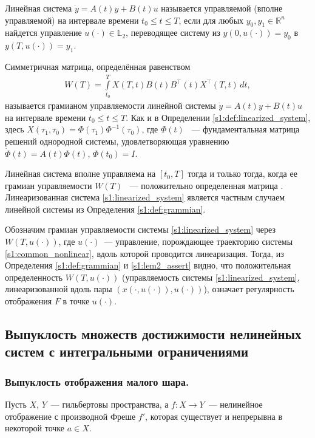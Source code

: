 \documentclass[../main.tex]{subfiles}
\begin{document}
\begin{definition}
	Линейная система $\dot{y} = A(t) y + B(t) u $ называется управляемой (вполне управляемой) на интервале времени $ t_0 \leqslant t \leqslant T $, если для любых $y_0, y_1 \in \mathbb{R}^n$ найдется управление $u(\cdot) \in \mathbb{L}_2$, переводящее систему из $y(0, u(\cdot)) = y_0 $ в $y(T, u(\cdot)) = y_1 $.
\end{definition}
 
\begin{definition}\label{s1:def:grammian}
 Симметричная матрица, определённая равенством
 \begin{gather*}
 W(T) = \int\limits_{t_0}^{T}X(T,t)B(t)B^{\top}(t)X^{\top}(T,t) \, dt,
 \end{gather*}
 называется грамианом управляемости линейной системы $\dot{y} = A(t) y + B(t) u $ на интервале времени $ t_0 \leqslant t \leqslant T $.
 Как и в Определении \ref{s1:def:linearized_system}, здесь $ X(\tau_1,\tau_0)= \Phi(\tau_1) \Phi^{-1}(\tau_0) $, где $\Phi(t) $ ~--- фундаментальная матрица решений однородной системы, удовлетворяющая уравнению $ \dot{\Phi}(t) = A(t) \Phi(t)$, $ \Phi(t_0) = I $.
\end{definition}
 
Линейная система вполне управляема на $ [t_0, T] $ тогда и только тогда, когда ее грамиан управляемости $W(T)$ ~--- положительно определенная матрица \cite[c. 176]{Chen}.
Линеаризованная система \eqref{s1:linearized_system} является частным случаем линейной системы из Определения \ref{s1:def:grammian}. 
 
Обозначим грамиан управляемости системы \eqref{s1:linearized_system} через $W(T,u(\cdot))$, где $u(\cdot)$~--- управление, порождающее траекторию системы \eqref{s1:common_nonlinear}, вдоль которой проводится линеаризация.
Тогда, из Определения \ref{s1:def:grammian} и \eqref{s1:lem2_assert} видно, что положительная определенность $W(T,u(\cdot))$ (управляемость системы \eqref{s1:linearized_system}, линеаризованной вдоль пары $\left( x(\cdot,u(\cdot)),u(\cdot)\right) $), означает регулярность отображения $F$ в точке $u(\cdot) $. 
 
\subsection{Выпуклость множеств достижимости нелинейных систем с интегральными ограничениями}
\subsubsection{Выпуклость отображения малого шара.}
Пусть $X$, $Y$~--- гильбертовы пространства, а $f: X \rightarrow Y$~--- нелинейное отображение с производной Фреше $f'$, которая существует и непрерывна в некоторой точке $a \in X$.
 
\end{document}
